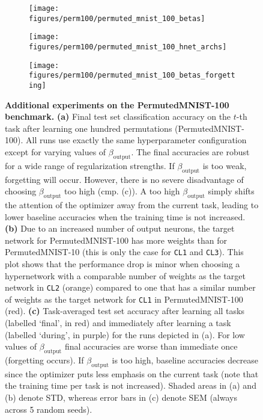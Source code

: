 \documentclass{article}
\begin{document}
\begin{figure}
    \centering
    \begin{subfigure}{0.49\linewidth}
    \caption{}
    \texttt{[image: figures/perm100/permuted\_mnist\_100\_betas]}
    \end{subfigure}
    \begin{subfigure}{0.49\linewidth}
    \caption{}
    \texttt{[image: figures/perm100/permuted\_mnist\_100\_hnet\_archs]}
    \end{subfigure}
    
    \begin{subfigure}{0.49\linewidth}
    \caption{}
    \texttt{[image: figures/perm100/permuted\_mnist\_100\_betas\_forgetting]}
    \end{subfigure}
    \caption{\textbf{Additional experiments on the PermutedMNIST-100 benchmark.} \textbf{(a)} Final test set classification accuracy on the $t$-th task after learning one hundred permutations (PermutedMNIST-100). All runs use exactly the same hyperparameter configuration except for varying values of $\beta_\text{output}$. The final accuracies are robust for a wide range of regularization strengths. If $\beta_\text{output}$ is too weak, forgetting will occur. However, there is no severe disadvantage of choosing $\beta_\text{output}$ too high (cmp. (c)). A too high $\beta_\text{output}$ simply shifts the attention of the optimizer away from the current task, leading to lower baseline accuracies when the training time is not increased. \textbf{(b)} Due to an increased number of output neurons, the target network for PermutedMNIST-100 has more weights than for PermutedMNIST-10 (this is only the case for \texttt{CL1} and \texttt{CL3}). This plot shows that the performance drop is minor when choosing a hypernetwork with a comparable number of weights as the target network in \texttt{CL2} (orange) compared to one that has a similar number of weights as the target network for  \texttt{CL1} in PermutedMNIST-100 (red). \textbf{(c)}  Task-averaged test set accuracy after learning all tasks (labelled `final', in red) and immediately after learning a task (labelled `during', in purple) for the runs depicted in (a). For low values of $\beta_\text{output}$ final accuracies are worse than immediate once (forgetting occurs). If $\beta_\text{output}$ is too high, baseline accuracies decrease since the optimizer puts less emphasis on the current task (note that the training time per task is not increased).
    Shaded areas in (a) and (b) denote STD, whereas error bars in (c) denote SEM (always across 5 random seeds).\label{fig:sm:permutedMNIST100}}
\end{figure}
\end{document}
